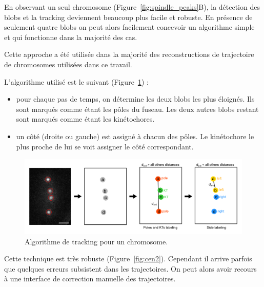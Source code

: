 \documentclass[12pt,a4paper,twoside,openright]{book}
\begin{document}
En observant un seul chromosome (Figure~\ref{fig:spindle_peaks}B), la
détection des blobs et la tracking deviennent beaucoup plus facile et
robuste. En présence de seulement quatre blobs on peut alors facilement
concevoir un algorithme simple et qui fonctionne dans la majorité des
cas.

Cette approche a été utilisée dans la majorité des reconstructions de
trajectoire de chromosomes utilisées dans ce travail.

L'algorithme utilisé est le suivant (Figure~\ref{fig:algo_cen2}) :

\begin{itemize}
\item
  pour chaque pas de temps, on détermine les deux blobs les plus
  éloignés. Ils sont marqués comme étant les pôles du fuseau. Les deux
  autres blobs restant sont marqués comme étant les kinétochores.
\item
  un côté (droite ou gauche) est assigné à chacun des pôles. Le
  kinétochore le plus proche de lui se voit assigner le côté
  correspondant.
\end{itemize}

\begin{figure}[htbp]
\centering
\includegraphics{figures/results/imaging/algo_cen2.png}
\caption[Algorithme de tracking pour un chromosome]{\label{fig:algo_cen2}Algorithme
de tracking pour un chromosome.}
\end{figure}

Cette technique est très robuste (Figure~\ref{fig:cen2}). Cependant il
arrive parfois que quelques erreurs subsistent dans les trajectoires. On
peut alors avoir recours à une interface de correction manuelle des
trajectoires.
\end{document}
